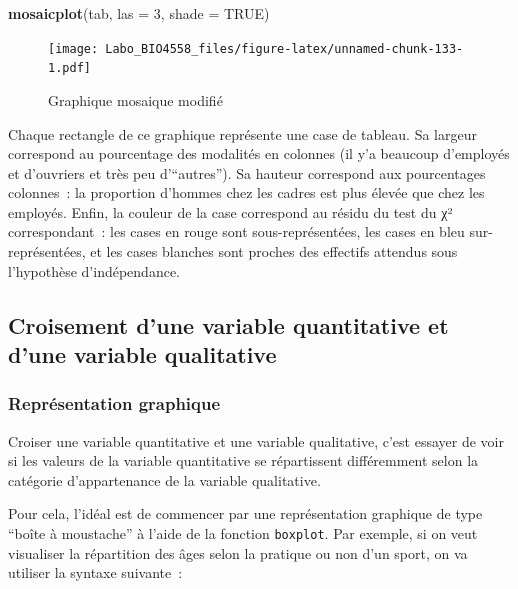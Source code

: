 \documentclass[12pt,]{book}
\newenvironment{Shaded}{\begin{snugshade}}{\end{snugshade}}
\newcommand{\DataTypeTok}[1]{\textcolor[rgb]{0.27,0.27,0.27}{#1}}
\newcommand{\DecValTok}[1]{\textcolor[rgb]{0.06,0.06,0.06}{#1}}
\newcommand{\KeywordTok}[1]{\textcolor[rgb]{0.27,0.27,0.27}{\textbf{#1}}}
\newcommand{\NormalTok}[1]{#1}
\newcommand{\OtherTok}[1]{\textcolor[rgb]{0.37,0.37,0.37}{#1}}
\begin{document}
\begin{Shaded}
\begin{Highlighting}[]
\KeywordTok{mosaicplot}\NormalTok{(tab, }\DataTypeTok{las =} \DecValTok{3}\NormalTok{, }\DataTypeTok{shade =} \OtherTok{TRUE}\NormalTok{)}
\end{Highlighting}
\end{Shaded}

\begin{figure}
\centering
\texttt{[image: Labo\_BIO4558\_files/figure-latex/unnamed-chunk-133-1.pdf]}
\caption{\label{fig:unnamed-chunk-133}Graphique mosaique modifié}
\end{figure}

Chaque rectangle de ce graphique représente une case de tableau. Sa largeur correspond au pourcentage des modalités en colonnes (il y'a beaucoup d'employés et d'ouvriers et très peu d'``autres''). Sa hauteur correspond aux pourcentages colonnes~: la proportion d'hommes chez les cadres est plus élevée que chez les employés. Enfin, la couleur de la case correspond au résidu du test du χ² correspondant~: les cases en rouge sont sous-représentées, les cases en bleu sur-représentées, et les cases blanches sont proches des effectifs attendus sous l'hypothèse d'indépendance.

\hypertarget{croisement-dune-variable-quantitative-et-dune-variable-qualitative}{%
\subsection{Croisement d'une variable quantitative et d'une variable qualitative}\label{croisement-dune-variable-quantitative-et-dune-variable-qualitative}}

\hypertarget{repruxe9sentation-graphique-1}{%
\subsubsection{Représentation graphique}\label{repruxe9sentation-graphique-1}}

Croiser une variable quantitative et une variable qualitative, c'est essayer de voir si les valeurs de la variable quantitative se répartissent différemment selon la catégorie d'appartenance de la variable qualitative.

Pour cela, l'idéal est de commencer par une représentation graphique de type ``boîte à moustache'' à l'aide de la fonction \texttt{boxplot}. Par exemple, si on veut visualiser la répartition des âges selon la pratique ou non d'un sport, on va utiliser la syntaxe suivante~:
\end{document}
